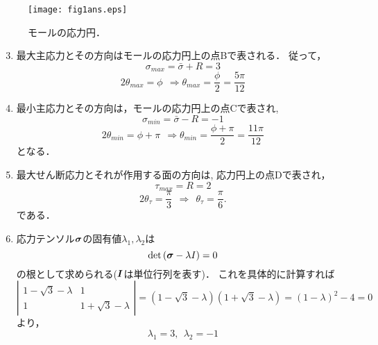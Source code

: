 \documentclass[10pt,a4j]{jarticle}
\begin{document}
\begin{figure}[h]
	\begin{center}
	\texttt{[image: fig1ans.eps]} 
	\end{center}
	\caption{モールの応力円．} 
	\label{fig:fig1}
\end{figure}
%
\begin{enumerate}
\setcounter{enumi}{2}
\item
最大主応力とその方向はモールの応力円上の点Bで表される． 従って，
\begin{equation}
	\sigma_{max}=\bar\sigma+R=3
\end{equation}
\begin{equation}
	2\theta_{max}=\phi 
	\ \ \Rightarrow 	
	\theta_{max}=\frac{\phi}{2} =\frac{5\pi}{12} 
\end{equation}
\item
最小主応力とその方向は，モールの応力円上の点Cで表され, 
\begin{equation}
	\sigma_{min}=\bar\sigma-R=-1
\end{equation}
\begin{equation}
	2\theta_{min}=\phi+\pi 
	\ \ \Rightarrow 	
	\theta_{min}=\frac{\phi+\pi}{2} =\frac{11\pi}{12} 
\end{equation}
となる．
\item
最大せん断応力とそれが作用する面の方向は, 応力円上の点Dで表され，
\begin{equation}
	\tau_{max}=R=2
\end{equation}
\begin{equation}
	2\theta_{\tau}=\frac{\pi}{3}  \ \ \Rightarrow \ \ 
	\theta_{\tau}=\frac{\pi}{6}.
\end{equation}
である．
\item
応力テンソル$\mbox{\boldmath $\sigma$}$の固有値$\lambda_1,\lambda_2$は
\begin{equation}
	\det \left( \mbox{\boldmath $\sigma$}-\lambda I  \right) =0
\end{equation}
の根として求められる($\mbox{\boldmath $I$}$は単位行列を表す)．
これを具体的に計算すれば
\begin{equation}
	\left| 
		\begin{array}{cc}
		1-\sqrt{3}-\lambda & 1 \\
		1 & 1+\sqrt{3}-\lambda 
		\end{array}
	\right|
	=
		(1-\sqrt{3}-\lambda)(1+\sqrt{3}-\lambda )
	=(1-\lambda)^2-4=0
\end{equation}
より，
\begin{equation}
	\lambda_1 = 3, \ \ \lambda_2 = -1

\end{equation}
\end{enumerate}
\end{document}
